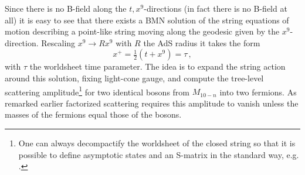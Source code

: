 \documentclass[a4paper,11pt]{article}
\begin{document}
Since there is no B-field along the $t,x^9$-directions (in fact there is no B-field at all) it is easy to see that there exists a BMN solution of the string equations of motion describing a point-like string moving along the geodesic given by the $x^9$-direction. Rescaling $x^9\rightarrow Rx^9$ with $R$ the AdS radius it takes the form
\begin{equation}
x^+=\tfrac12(t+x^9)=\tau\,,
\label{eq:BMN-sol}
\end{equation}
with $\tau$ the worldsheet time parameter. The idea is to expand the string action around this solution, fixing light-cone gauge, and compute the tree-level scattering amplitude\footnote{One can always decompactify the worldsheet of the closed string so that it is possible to define asymptotic states and an S-matrix in the standard way, e.g. \cite{Arutyunov:2009ga}.} for two identical bosons from $M_{10-n}$ into two fermions. As remarked earlier factorized scattering requires this amplitude to vanish unless the masses of the fermions equal those of the bosons.
\end{document}
